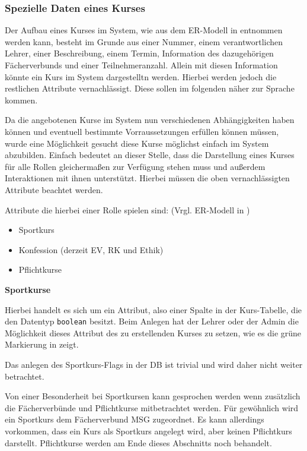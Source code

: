 \documentclass[12pt, twoside, a4paper, ngerman]{article}
\begin{document}
\subsubsection{Spezielle Daten eines Kurses}

Der Aufbau eines Kurses im System, wie aus dem ER-Modell in  entnommen werden kann, besteht im Grunde aus einer Nummer, einem verantwortlichen Lehrer, einer Beschreibung, einem Termin, Information des dazugehörigen Fächerverbunds  und einer Teilnehmeranzahl. Allein mit diesen Information könnte ein Kurs im System dargestelltn werden. Hierbei werden jedoch die restlichen Attribute vernachlässigt. Diese sollen im folgenden näher zur Sprache kommen.  

Da die angebotenen Kurse im System nun verschiedenen Abhängigkeiten haben können und eventuell bestimmte Vorraussetzungen erfüllen können müssen, wurde eine Möglichkeit gesucht diese Kurse möglichst einfach im System abzubilden. 
Einfach bedeutet an dieser Stelle, dass die Darstellung eines Kurses für alle Rollen gleichermaßen zur Verfügung stehen muss und außerdem Interaktionen mit ihnen unterstützt.
Hierbei müssen die oben vernachlässigten Attribute beachtet werden. 

Attribute die hierbei einer Rolle spielen sind: (Vrgl. ER-Modell in )
\begin{itemize}
  \item Sportkurs
  \item Konfession (derzeit EV, RK und Ethik)
  \item Pflichtkurse
\end{itemize}

\textbf{Sportkurse}

Hierbei handelt es sich um ein Attribut, also einer Spalte in der Kurs-Tabelle, die den Datentyp \texttt{boolean} besitzt.
Beim Anlegen hat der Lehrer oder der Admin die Möglichkeit dieses Attribut des zu erstellenden Kurses zu setzen, wie es die grüne Markierung in  zeigt.

Das anlegen des Sportkurs-Flags in der DB ist trivial und wird daher nicht weiter betrachtet.

Von einer Besonderheit bei Sportkursen kann gesprochen werden wenn zusätzlich die Fächerverbünde und Pflichtkurse mitbetrachtet werden.
Für gewöhnlich wird ein Sportkurs dem Fächerverbund \ac{MSG} zugeordnet. Es kann allerdings vorkommen, dass ein Kurs als Sportkurs angelegt wird, aber keinen Pflichtkurs darstellt.  
Pflichtkurse werden am Ende dieses Abschnitts noch behandelt.
\end{document}
